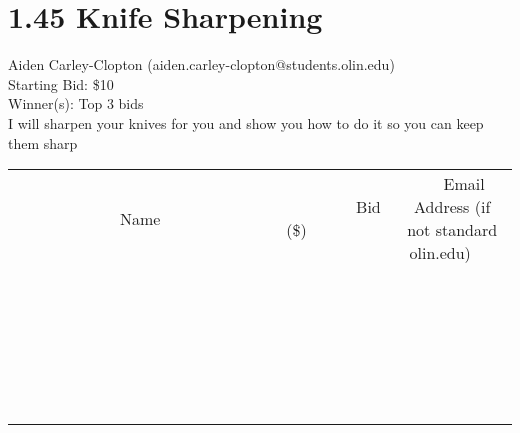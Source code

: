 \documentclass[11pt]{article}
\begin{document}
\section*{1.45 Knife Sharpening}
Aiden Carley-Clopton (aiden.carley-clopton@students.olin.edu) \\
Starting Bid: \$10 \\
Winner(s): 
Top 3 bids \\
I will sharpen your knives for you and show you how to do it so you can keep them sharp \\[6ex]
\begin{tabular}{c c c}
~~~~~~~~~~~~~Name~~~~~~~~~~~~~ & ~~~~~~~~~Bid (\$)~~~~~~~~~ & ~~~Email Address (if not standard olin.edu)~~~ \\
 & & \\
\hline
 & & \\
\hline
 & & \\
\hline
 & & \\
\hline
 & & \\
\hline
 & & \\
\hline
 & & \\
\hline
 & & \\
\hline
 & & \\
\hline
 & & \\
\hline
 & & \\
\hline
 & & \\
\hline
 & & \\
\hline
 & & \\
\hline
 & & \\
\hline
 & & \\
\hline
 & & \\
\hline
 & & \\
\hline
 & & \\
\hline
 & & \\
\hline
 & & \\
\hline
 & & \\
\hline
 & & \\
\hline
 & & \\
\hline
 & & \\
\hline
 & & \\
\hline
\end{tabular}
\clearpage
\end{document}
